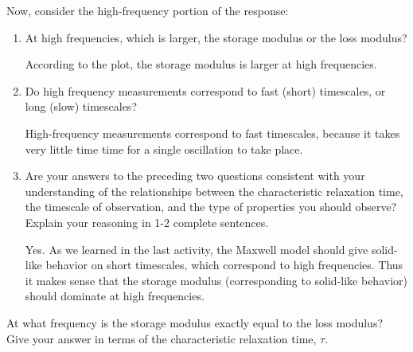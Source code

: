 \begin{activity}
\begin{ctqs}
\begin{enumerate}
\begin{solution}[2in]
				\end{solution}
	
		\end{enumerate}
	
	\question Now, consider the high-frequency portion of the response:
	
		\begin{enumerate}
		
			\item At high frequencies, which is larger, the storage modulus or the loss modulus?
	
					\begin{solution}[1in]
					
						According to the plot, the storage modulus is larger at high frequencies.
					
					\end{solution}
					
			\item Do high frequency measurements correspond to fast (short) timescales, or long (slow) timescales?
			
				\begin{solution}[1in]
				
					High-frequency measurements correspond to fast timescales, because it takes very little time time for a single oscillation to take place.
				
				\end{solution}
					
			\item Are your answers to the preceding two questions consistent with your understanding of the relationships between the characteristic relaxation time, the timescale of observation, and the type of properties you should observe?  Explain your reasoning in 1-2 complete sentences.
			
				\begin{solution}[2in]
				
					Yes. As we learned in the last activity, the Maxwell model should give solid-like behavior on short timescales, which correspond to high frequencies.  Thus it makes sense that the storage modulus (corresponding to solid-like behavior) should dominate at high frequencies.
				
				\end{solution}
	\end{enumerate}

	\question At what frequency is the storage modulus exactly equal to the loss modulus?  Give your answer in terms of the characteristic relaxation time, $\tau$.
	

\end{ctqs}
\end{activity}
